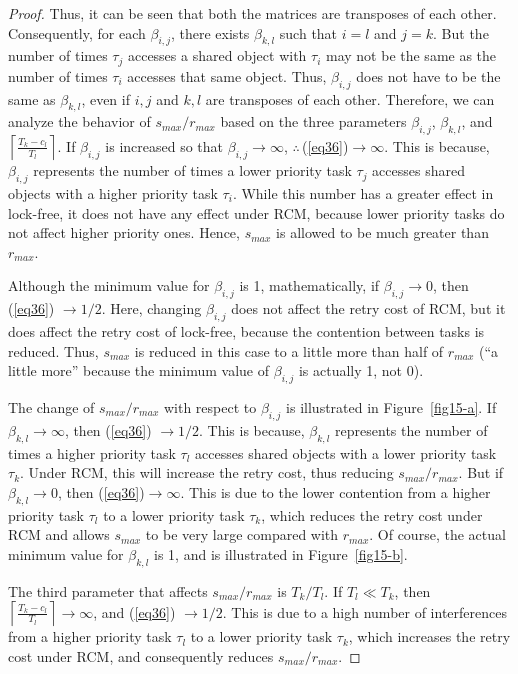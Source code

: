 \documentclass[12pt,english]{report}
\newtheorem{proof}{Proof}
\begin{document}
\begin{proof}
Thus, it can be seen that both the matrices are transposes of
each other. Consequently, for each $\beta_{i,j}$, there exists $\beta_{k,l}$
such that $i=l$ and $j=k$. But the number of times $\tau_{j}$ accesses
a shared object with $\tau_{i}$ may not be the same as the number of times
$\tau_{i}$ accesses that same object. Thus, $\beta_{i,j}$ does not have
to be the same as $\beta_{k,l}$, even if $i,j$ and $k,l$ are transposes 
of each other. Therefore, we can analyze the behavior of $s_{max}/r_{max}$ based on the three parameters $\beta_{i,j}$, $\beta_{k,l}$, and $\left\lceil\frac{T_{k}-c_{l}}{T_{l}}\right\rceil$.
If $\beta_{i,j}$ is increased so that $\beta_{i,j}\rightarrow\infty$,
$\therefore\,$(\ref{eq36})$\rightarrow\infty$.
This is because, $\beta_{i,j}$ represents the number of times a lower priority task $\tau_{j}$ accesses 
shared objects with a higher priority task $\tau_{i}$. 
While this number has a greater effect in lock-free, it does not have any effect under RCM, because lower priority tasks do not affect higher priority
ones. Hence, $s_{max}$ is allowed to be much greater than $r_{max}$.

Although the minimum value for $\beta_{i,j}$ is 1, mathematically, if $\beta_{i,j}\rightarrow0$, then (\ref{eq36}) 
 $\rightarrow1/2$.
Here, changing $\beta_{i,j}$ does not affect the retry cost of RCM, but it does affect the retry cost of lock-free, because the contention between tasks is reduced. Thus, $s_{max}$ is reduced in this case to
a little more than half of $r_{max}$ (``a little more''
because the minimum value of $\beta_{i,j}$ is actually 1, not 0).


The change of $s_{max}/r_{max}$ with respect to $\beta_{i,j}$ is illustrated in Figure~\ref{fig15-a}.
If $\beta_{k,l}\rightarrow\infty$, then (\ref{eq36}) $\rightarrow1/2$.
This is because, $\beta_{k,l}$ represents the number of times 
a higher priority task $\tau_{l}$ accesses shared objects with a lower
priority task $\tau_{k}$. Under RCM, this will increase the retry 
cost, thus reducing $s_{max}/r_{max}$. But if $\beta_{k,l}\rightarrow0$, then (\ref{eq36})$\rightarrow\infty$. This is due to the lower contention from a higher priority task $\tau_{l}$ to a lower priority task $\tau_{k}$, which reduces the retry cost under RCM and allows $s_{max}$ to be very large compared with $r_{max}$. Of course, the actual minimum value for $\beta_{k,l}$ is 1, and is illustrated in Figure~\ref{fig15-b}.


The third parameter that affects $s_{max}/r_{max}$ is $T_{k}/T_{l}$.
If $T_{l}\ll T_{k}$, then $\left\lceil\frac{T_{k}-c_{l}}{T_{l}}\right\rceil\rightarrow\infty$,
and (\ref{eq36}) $\rightarrow1/2$. This is due to a high number
of interferences from a higher priority task $\tau_{l}$ to a lower priority
task $\tau_{k}$, which increases the retry cost under RCM, 
and consequently reduces $s_{max}/r_{max}$. 


\end{proof}
\end{document}
